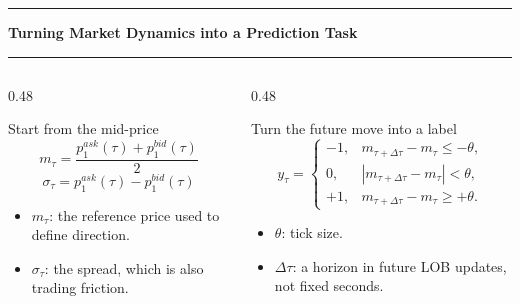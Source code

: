 \documentclass[aspectratio=169,10pt]{beamer}
\newcommand{\tightitems}{\setlength{\itemsep}{0.35em}}
\newcommand{\contentheader}[1]{%
  \vspace*{0.05em}%
  {\noindent\color{BrandOrange}\rule{0.42em}{0.42em}\hspace{0.50em}\bfseries\Large #1\par}%
  \vspace{0.15em}%
  {\color{BrandOrange}\rule{\textwidth}{1.4pt}\par}%
  \vspace{0.42em}%
}
\begin{document}
\begin{frame}[plain]
\contentheader{Turning Market Dynamics into a Prediction Task}
\begin{columns}[T,totalwidth=\textwidth]
\begin{column}{0.48\textwidth}
\begin{block}{Start from the mid-price}
\[
m_\tau=\frac{p^{ask}_{1}(\tau)+p^{bid}_{1}(\tau)}{2}
\]
\[
\sigma_\tau=p^{ask}_{1}(\tau)-p^{bid}_{1}(\tau)
\]
\end{block}
\begin{itemize}\tightitems
  \item \(m_\tau\): the reference price used to define direction.
  \item \(\sigma_\tau\): the spread, which is also trading friction.
\end{itemize}
\end{column}
\begin{column}{0.48\textwidth}
\begin{block}{Turn the future move into a label}
\[
y_\tau =
\begin{cases}
-1, & m_{\tau+\Delta\tau}-m_\tau\le -\theta,\\
0, & |m_{\tau+\Delta\tau}-m_\tau|<\theta,\\
+1, & m_{\tau+\Delta\tau}-m_\tau\ge +\theta.
\end{cases}
\]
\end{block}
\begin{itemize}\tightitems
  \item \(\theta\): tick size.
  \item \(\Delta\tau\): a horizon in future LOB updates, not fixed seconds.
\end{itemize}
\end{column}
\end{columns}
\end{frame}
\end{document}
